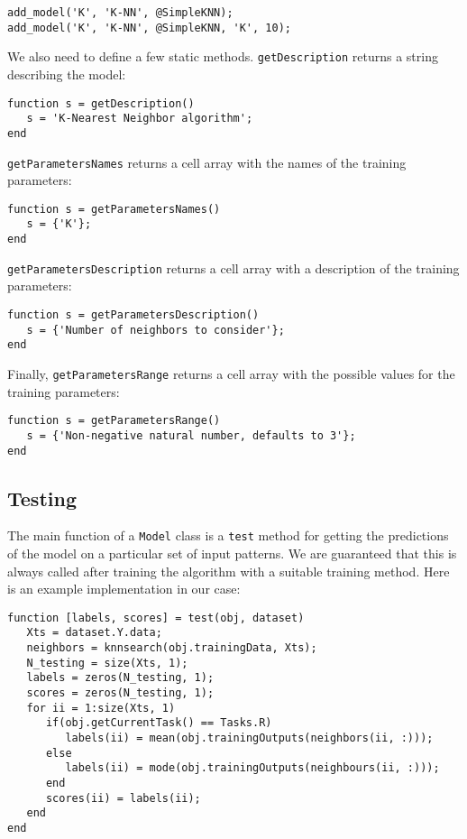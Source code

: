 \begin{lstlisting}
add_model('K', 'K-NN', @SimpleKNN);
add_model('K', 'K-NN', @SimpleKNN, 'K', 10);
\end{lstlisting}

\noindent We also need to define a few static methods. \verb|getDescription| returns a string describing the model:

\begin{lstlisting}
function s = getDescription()
   s = 'K-Nearest Neighbor algorithm';
end
\end{lstlisting}

\noindent \verb|getParametersNames| returns a cell array with the names of the training parameters:

\begin{lstlisting}
function s = getParametersNames()
   s = {'K'};
end
\end{lstlisting}

\noindent \verb|getParametersDescription| returns a cell array with a description of the training parameters:

\begin{lstlisting}
function s = getParametersDescription()
   s = {'Number of neighbors to consider'};
end
\end{lstlisting}

\noindent Finally, \verb|getParametersRange| returns a cell array with the possible values for the training parameters:

\begin{lstlisting}
function s = getParametersRange()
   s = {'Non-negative natural number, defaults to 3'};
end
\end{lstlisting}

\subsection{Testing}

The main function of a \verb|Model| class is a \verb|test| method for getting the predictions of the model on a particular set of input patterns. We are guaranteed that this is always called after training the algorithm with a suitable training method. Here is an example implementation in our case:

\begin{lstlisting}
function [labels, scores] = test(obj, dataset)
   Xts = dataset.Y.data;
   neighbors = knnsearch(obj.trainingData, Xts);
   N_testing = size(Xts, 1);
   labels = zeros(N_testing, 1);
   scores = zeros(N_testing, 1);
   for ii = 1:size(Xts, 1)
      if(obj.getCurrentTask() == Tasks.R)
         labels(ii) = mean(obj.trainingOutputs(neighbors(ii, :)));
      else
         labels(ii) = mode(obj.trainingOutputs(neighbours(ii, :)));
      end
      scores(ii) = labels(ii);
   end
end
\end{lstlisting}

